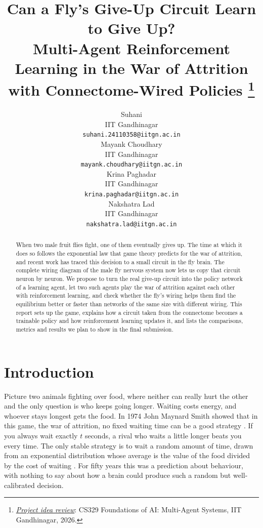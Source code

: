 \documentclass{article}
\title{Can a Fly's Give-Up Circuit Learn to Give Up?\\
Multi-Agent Reinforcement Learning in the War of Attrition with Connectome-Wired Policies
\thanks{\textit{\underline{Project idea review}}: CS329 Foundations of AI: Multi-Agent Systems, IIT Gandhinagar, 2026.}}
\author{
  Suhani \\
  IIT Gandhinagar \\
  \texttt{suhani.24110358@iitgn.ac.in} \\
  \And
  Mayank Choudhary \\
  IIT Gandhinagar \\
  \texttt{mayank.choudhary@iitgn.ac.in} \\
  \AND
  Krina Paghadar \\
  IIT Gandhinagar \\
  \texttt{krina.paghadar@iitgn.ac.in} \\
  \And
  Nakshatra Lad \\
  IIT Gandhinagar \\
  \texttt{nakshatra.lad@iitgn.ac.in} \\
}
\begin{document}
\maketitle

\begin{abstract}
When two male fruit flies fight, one of them eventually gives up. The time at which it does so follows the exponential law that game theory predicts for the war of attrition, and recent work has traced this decision to a small circuit in the fly brain. The complete wiring diagram of the male fly nervous system now lets us copy that circuit neuron by neuron. We propose to turn the real give-up circuit into the policy network of a learning agent, let two such agents play the war of attrition against each other with reinforcement learning, and check whether the fly's wiring helps them find the equilibrium better or faster than networks of the same size with different wiring. This report sets up the game, explains how a circuit taken from the connectome becomes a trainable policy and how reinforcement learning updates it, and lists the comparisons, metrics and results we plan to show in the final submission.
\end{abstract}


\section{Introduction}
\label{sec:intro}

Picture two animals fighting over food, where neither can really hurt the other and the only question is who keeps going longer. Waiting costs energy, and whoever stays longest gets the food. In 1974 John Maynard Smith showed that in this game, the war of attrition, no fixed waiting time can be a good strategy \citep{maynardsmith1974}. If you always wait exactly $t$ seconds, a rival who waits a little longer beats you every time. The only stable strategy is to wait a random amount of time, drawn from an exponential distribution whose average is the value of the food divided by the cost of waiting \citep{maynardsmith1974, bishop1978}. For fifty years this was a prediction about behaviour, with nothing to say about how a brain could produce such a random but well-calibrated decision.
\end{document}
